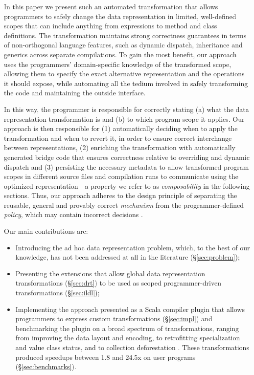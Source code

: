 In this paper we present such an automated transformation that allows programmers to safely change the data representation in limited, well-defined scopes that can include anything from expressions to method and class definitions. The transformation maintains strong correctness guarantees in terms of non-orthogonal language features, such as dynamic dispatch, inheritance and generics across separate compilations. To gain the most benefit, our approach uses the programmers' domain-specific knowledge of the transformed scope, allowing them to specify the exact alternative representation and the operations it should expose, while automating all the tedium involved in safely transforming the code and maintaining the outside interface.

In this way, the programmer is responsible for correctly stating (a) what the data representation transformation is and (b) to which program scope it applies. Our approach is then responsible for (1) automatically deciding when to apply the transformation and when to revert it, in order to ensure correct interchange between representations, (2) enriching the transformation with automatically generated bridge code that ensures correctness relative to overriding and dynamic dispatch and (3) persisting the necessary metadata to allow transformed program scopes in different source files and compilation runs to communicate using the optimized representation---a property we refer to as \emph{composability} in the following sections. Thus, our approach adheres to the design principle of separating the reusable, general and provably correct \emph{mechanism} from the programmer-defined \emph{policy}, which may contain incorrect decisions \cite{lampson-mechanism-policy}.

Our main contributions are:
\begin{itemize}
  \item Introducing the ad hoc data representation problem, which, to the best of our knowledge, has not been addressed at all in the literature (\S\ref{sec:problem});
  \item Presenting the extensions that allow global data representation transformations (\S\ref{sec:drt}) to be used as scoped programmer-driven transformations (\S\ref{sec:ildl});
  \item Implementing the approach presented as a Scala compiler plugin \cite{ildl-plugin} that allows programmers to express custom transformations (\S\ref{sec:impl}) and benchmarking the plugin on a broad spectrum of transformations, ranging from improving the data layout and encoding, to retrofitting specialization and value class status, and to collection deforestation \cite{wadler-deforestation}. These transformations produced  speedups between 1.8 and 24.5x on user programs (\S\ref{sec:benchmarks}).
\end{itemize}

